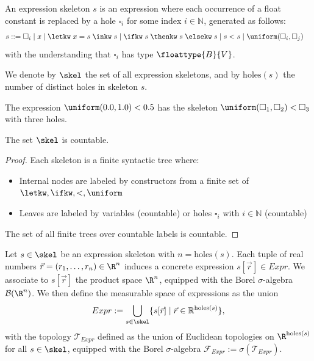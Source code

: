 \begin{definition}
	An expression skeleton $s$ is an expression where each occurrence of a float constant is replaced by a hole $\square_i$ for some index $i \in \mathbb{N}$, generated as follows:
	\begin{align*}
		s ::= \; 
		&\square_i \mid x \mid \letkw \; x = s \; \inkw \; s \mid \ifkw \; s \; \thenkw \; s \; \elsekw \; s \mid s < s \mid \uniform(\square_i, \square_j)
	\end{align*}
	with the understanding that $\square_i$ has type $\floattype{B}{V}$.
	
	We denote by $\skel$ the set of all expression skeletons, and by $\text{holes}(s)$ the number of distinct holes in skeleton $s$.
\end{definition}

\begin{example}
	The expression $\uniform(0.0, 1.0) < 0.5$ has the skeleton $\uniform(\square_1, \square_2) < \square_3$ with three holes. 
\end{example}

\begin{lemma}
	The set $\skel$ is countable.
\end{lemma}

\begin{proof}
	Each skeleton is a finite syntactic tree where:
	\begin{itemize}
	\item Internal nodes are labeled by constructors from a finite set of ${\letkw, \ifkw, <, \uniform}$
	\item Leaves are labeled by variables (countable) or holes $\square_i$ with $i \in \mathbb{N}$ (countable)
	\end{itemize}
	The set of all finite trees over countable labels is countable.
\end{proof}

\begin{definition}\label{def:meas-space}
	Let $s \in \skel$ be an expression skeleton with $n = \text{holes}(s)$. Each tuple of real numbers $\vec{r} = (r_1, \ldots, r_n) \in \R^n$ induces a concrete expression $s[\vec{r}] \in Expr$. We associate to $s[\vec{r}]$ the product space $\R^n$, equipped with the Borel $\sigma$-algebra $\mathcal{B}(\R^n)$. We then define the measurable space of expressions as the union
	\[
		Expr := \bigcup_{s \in \skel} \{s[\vec{r}] \mid \vec{r} \in \mathbb{R}^{\text{holes}(s)}\},
	\]
	with the topology $\mathcal{T}_{Expr}$ defined as the union of Euclidean topologies on $\R^{\text{holes}(s)}$ for all $s \in \skel$, equipped with the Borel $\sigma$-algebra $\mathcal{F}_{Expr} := \sigma(\mathcal{T}_{Expr})$.
\end{definition}

